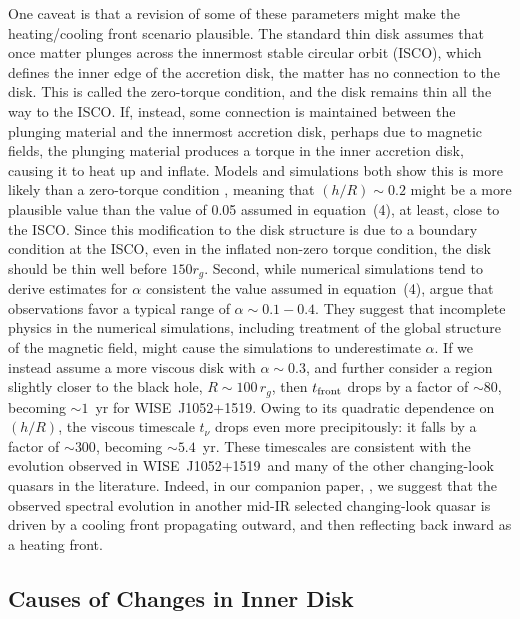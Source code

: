 \documentclass[iop]{emulateapj}
\def\eg{{e.g.}}
\def\qso{WISE~J1052+1519}
\begin{document}
One caveat is that a revision of some of these
parameters might make the heating/cooling front scenario plausible.
The standard \citet{Shakura:73} thin disk assumes that once matter
plunges across the innermost stable circular orbit (ISCO), which
defines the inner edge of the accretion disk, the matter has no
connection to the disk.  This is called the zero-torque condition,
and the disk remains thin all the way to the ISCO.  If, instead,
some connection is maintained between the plunging material and the
innermost accretion disk, perhaps due to magnetic fields, the
plunging material produces a torque in the inner accretion disk,
causing it to heat up and inflate.  Models and simulations both
show this is more likely than a zero-torque condition
\citep[\eg,][]{Agol:00}, meaning that $(h/R) \sim 0.2$ might be a
more plausible value than the value of 0.05 assumed in equation~(4),
at least, close to the ISCO.  Since this modification to the
disk structure is due to a boundary condition at the ISCO, even in
the inflated non-zero torque condition, the disk should be thin
well before $150 r_g$.  Second, while numerical simulations
\citep[\eg,][]{Hirose:09, Davis:10} tend to derive estimates for
$\alpha$ consistent the value assumed in equation~(4), \citet{King:07}
argue that observations favor a typical range of $\alpha \sim 0.1
- 0.4$.  They suggest that incomplete physics in the numerical
simulations, including treatment of the global structure of the
magnetic field, might cause the simulations to underestimate $\alpha$.
If we instead assume a more viscous disk with $\alpha \sim 0.3$,
and further consider a region slightly closer to the black hole,
$R \sim 100\, r_g$, then $t_{\rm front}$ drops by a factor of $\sim
80$, becoming $\sim 1$~yr for \qso.  Owing to its quadratic dependence
on $(h/R)$, the viscous timescale $t_\nu$ drops even more precipitously:
it falls by a factor of $\sim 300$, becoming $\sim 5.4$~yr. These
timescales are consistent with the evolution observed in \qso\ and
many of the other changing-look quasars in the literature.  Indeed,
in our companion paper, \citet{Ross:18}, we suggest that the observed
spectral evolution in another mid-IR selected changing-look quasar
is driven by a cooling front propagating outward, and then reflecting
back inward as a heating front.



\subsection{Causes of Changes in Inner Disk}
\label{sec:disk}
\end{document}
